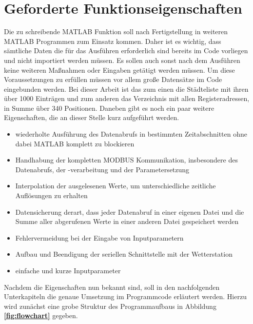 \section{Geforderte Funktionseigenschaften}
Die zu schreibende MATLAB Funktion soll nach Fertigstellung in weiteren MATLAB Programmen zum Einsatz kommen. Daher ist es wichtig, dass sämtliche Daten die für das Ausführen erforderlich sind bereits im Code vorliegen und nicht importiert werden müssen. Es sollen auch sonst nach dem Ausführen keine weiteren Maßnahmen oder Eingaben getätigt werden müssen. Um diese Voraussetzungen zu erfüllen müssen vor allem große Datensätze im Code eingebunden werden.\label{createstruct} Bei dieser Arbeit ist das zum einen die Städteliste mit ihren über 1000 Einträgen und zum anderen das Verzeichnis mit allen Registeradressen, in Summe über 340 Positionen. Daneben gibt es noch ein paar weitere Eigenschaften, die an dieser Stelle kurz aufgeführt werden.
\begin{itemize}
\item wiederholte Ausführung des Datenabrufs in bestimmten Zeitabschnitten ohne dabei MATLAB komplett zu blockieren
\item Handhabung der kompletten MODBUS Kommunikation, insbesondere des Datenabrufs, der -verarbeitung und der Parametersetzung
\item Interpolation der ausgelesenen Werte, um unterschiedliche zeitliche Auflösungen zu erhalten
\item Datensicherung derart, dass jeder Datenabruf in einer eigenen Datei und die Summe aller abgerufenen Werte in einer anderen Datei gespeichert werden
\item Fehlervermeidung bei der Eingabe von Inputparametern
\item Aufbau und Beendigung der seriellen Schnittstelle mit der Wetterstation
\item einfache und kurze Inputparameter
\end{itemize}
Nachdem die Eigenschaften nun bekannt sind, soll in den nachfolgenden Unterkapiteln die genaue Umsetzung im Programmcode erläutert werden. Hierzu wird zunächst eine grobe Struktur des Programmaufbaus in Abbildung \textbf{\ref{fig:flowchart}} gegeben. 
